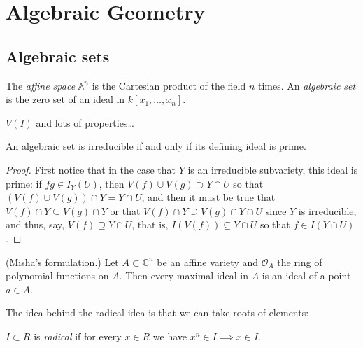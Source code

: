 \documentclass{book}
\begin{document}
\clearpage


\chapter{Algebraic Geometry}
\label{chapter-algebraic-geometry}





\section{Algebraic sets}
\label{section-algebraic-sets}

\noindent
The {\it affine space} $\mathbb{A}^n$ is the
Cartesian
product of the field $n$ times.
An {\it algebraic set} is the zero set of an
ideal
in $k[x_1,…,x_n]$.

$V(I)$ and lots of properties…

\begin{lemma}
\label{lemma-irreducible-variety-prime-ideal}
An algebraic set is irreducible if and only
if
its defining ideal is prime.
\end{lemma}

\begin{proof}
First notice that in
the case that $Y$ is an irreducible
subvariety,
this ideal is prime: if $fg \in I_Y(U)$,
then $V(f) \cup  V(g) \supset Y\cap U$
so that $(V(f) \cup  V(g))\cap Y = Y\cap U$,
and then it must be true that $V(f)\cap
Y\subseteq V(g)\cap Y$
or that $V(f)\cap Y \supseteq V(g)\cap Y \cap
U$
since $Y$ is irreducible, and thus, say,
$V(f)\supseteq Y \cap U$,
that is, $I(V(f))\subseteq Y \cap U$
so that $f \in I(Y \cap U)$.
\end{proof}

\begin{theorem}
\label{theorem-weak-nullstellensatz}
(Misha's formulation.) Let $A \subset
\mathbb{C}^n$
be an affine variety and $\mathcal{O}_A$ the
ring of polynomial
functions on $A$.
Then every maximal ideal in $A$
is an ideal of a point $a \in A$.
\end{theorem}

\noindent
The idea behind the radical idea is that
we can take roots of elements:

\begin{definition}
\label{definition-radical-ideal}
$I \subset R$ is {\it radical}
if for every $x \in R$ we have $x^n \in I
\implies x \in I$.
\end{definition}
\end{document}
